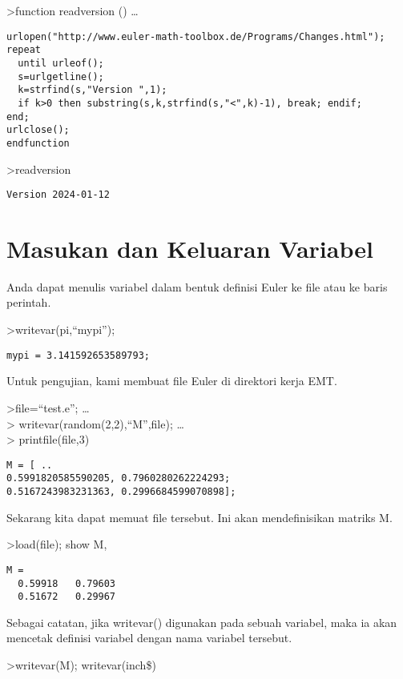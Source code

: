 \documentclass[
]{book}
\begin{document}
\textgreater function readversion () \ldots{}

\begin{verbatim}
urlopen("http://www.euler-math-toolbox.de/Programs/Changes.html");
repeat
  until urleof();
  s=urlgetline();
  k=strfind(s,"Version ",1);
  if k>0 then substring(s,k,strfind(s,"<",k)-1), break; endif;
end;
urlclose();
endfunction
\end{verbatim}

\textgreater readversion

\begin{verbatim}
Version 2024-01-12
\end{verbatim}

\chapter{Masukan dan Keluaran Variabel}\label{masukan-dan-keluaran-variabel}

Anda dapat menulis variabel dalam bentuk definisi Euler ke file atau ke baris perintah.

\textgreater writevar(pi,``mypi'');

\begin{verbatim}
mypi = 3.141592653589793;
\end{verbatim}

Untuk pengujian, kami membuat file Euler di direktori kerja EMT.

\textgreater file=``test.e''; \ldots{}\\
\textgreater{} writevar(random(2,2),``M'',file); \ldots{}\\
\textgreater{} printfile(file,3)

\begin{verbatim}
M = [ ..
0.5991820585590205, 0.7960280262224293;
0.5167243983231363, 0.2996684599070898];
\end{verbatim}

Sekarang kita dapat memuat file tersebut. Ini akan mendefinisikan matriks M.

\textgreater load(file); show M,

\begin{verbatim}
M = 
  0.59918   0.79603 
  0.51672   0.29967 
\end{verbatim}

Sebagai catatan, jika writevar() digunakan pada sebuah variabel, maka ia akan mencetak definisi variabel dengan nama variabel tersebut.

\textgreater writevar(M); writevar(inch\$)
\end{document}
